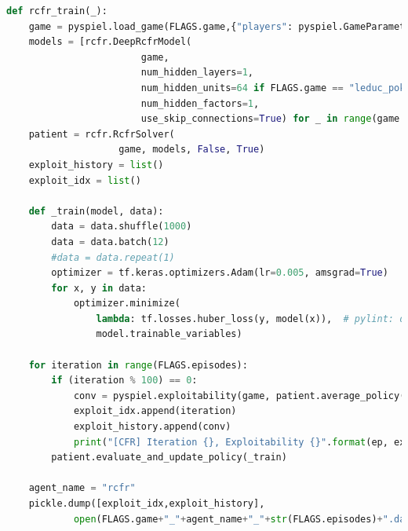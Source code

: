 \documentclass[10pt,a4paper]{article}
\begin{document}
\begin{lstlisting}[language=Python]
def rcfr_train(_):
    game = pyspiel.load_game(FLAGS.game,{"players": pyspiel.GameParameter(2)})
    models = [rcfr.DeepRcfrModel(
                        game,
                        num_hidden_layers=1,
                        num_hidden_units=64 if FLAGS.game == "leduc_poker" else 13,
                        num_hidden_factors=1,
                        use_skip_connections=True) for _ in range(game.num_players())]
    patient = rcfr.RcfrSolver(
                    game, models, False, True)
    exploit_history = list()
    exploit_idx = list()

    def _train(model, data):
        data = data.shuffle(1000)
        data = data.batch(12)
        #data = data.repeat(1)  
        optimizer = tf.keras.optimizers.Adam(lr=0.005, amsgrad=True)    
        for x, y in data:
            optimizer.minimize(
                lambda: tf.losses.huber_loss(y, model(x)),  # pylint: disable=cell-var-from-loop
                model.trainable_variables)

    for iteration in range(FLAGS.episodes):
        if (iteration % 100) == 0:
            conv = pyspiel.exploitability(game, patient.average_policy())
            exploit_idx.append(iteration)
            exploit_history.append(conv)
            print("[CFR] Iteration {}, Exploitability {}".format(ep, expl))
        patient.evaluate_and_update_policy(_train)

    agent_name = "rcfr"
    pickle.dump([exploit_idx,exploit_history],
    		open(FLAGS.game+"_"+agent_name+"_"+str(FLAGS.episodes)+".dat","wb"))

\end{lstlisting}
\end{document}
